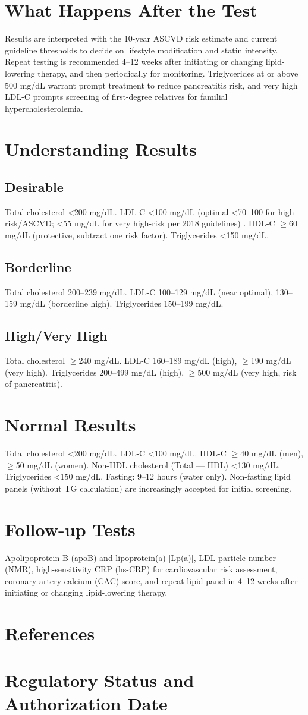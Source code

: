 \section*{What Happens After the Test}
Results are interpreted with the 10-year ASCVD risk estimate and current guideline thresholds to decide on lifestyle modification and statin intensity. Repeat testing is recommended 4--12 weeks after initiating or changing lipid-lowering therapy, and then periodically for monitoring. Triglycerides at or above 500 mg/dL warrant prompt treatment to reduce pancreatitis risk, and very high LDL-C prompts screening of first-degree relatives for familial hypercholesterolemia.
\section*{Understanding Results}
\subsection*{Desirable}
Total cholesterol <200 mg/dL. LDL-C <100 mg/dL (optimal <70--100 for high-risk/ASCVD; <55 mg/dL for very high-risk per 2018 guidelines) \cite{necp2001executive}. HDL-C $\geq$60 mg/dL (protective, subtract one risk factor). Triglycerides <150 mg/dL.
\subsection*{Borderline}
Total cholesterol 200--239 mg/dL. LDL-C 100--129 mg/dL (near optimal), 130--159 mg/dL (borderline high). Triglycerides 150--199 mg/dL.
\subsection*{High/Very High}
Total cholesterol $\geq$240 mg/dL. LDL-C 160--189 mg/dL (high), $\geq$190 mg/dL (very high). Triglycerides 200--499 mg/dL (high), $\geq$500 mg/dL (very high, risk of pancreatitis).
\section*{Normal Results}
Total cholesterol <200 mg/dL. LDL-C <100 mg/dL. HDL-C $\geq$40 mg/dL (men), $\geq$50 mg/dL (women). Non-HDL cholesterol (Total --- HDL) <130 mg/dL. Triglycerides <150 mg/dL. Fasting: 9--12 hours (water only). Non-fasting lipid panels (without TG calculation) are increasingly accepted for initial screening.
\section*{Follow-up Tests}
Apolipoprotein B (apoB) and lipoprotein(a) [Lp(a)], LDL particle number (NMR), high-sensitivity CRP (hs-CRP) for cardiovascular risk assessment, coronary artery calcium (CAC) score, and repeat lipid panel in 4--12 weeks after initiating or changing lipid-lowering therapy.
\section*{References}



\clearpage
\section*{Regulatory Status and Authorization Date}

\clearpage
